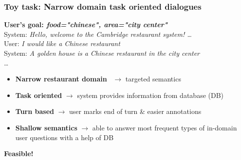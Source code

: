 \documentclass[10pt, compress,british,xcolor={svgnames,dvipsnames,x11names},trans]{beamer}
\def\sys#1{{\color{purple}System: \it #1}}
\def\usr#1{{\color{brown}User: \it #1}}
\begin{document}
\begin{frame}\frametitle{Toy task: Narrow domain task oriented dialogues}
    {\bf User's goal: {\it food="chinese", area="city center"}} \\
    \vfill
    \sys{Hello, welcome to the Cambridge restaurant system! \dots } \\
    \usr{I would like a Chinese restaurant} \\
    \sys{A golden house is a Chinese restaurant in the city center} \\
    \dots

    \begin{itemize}
        \item {\bf Narrow restaurant domain}~\cite{henderson2014second} $\longrightarrow$ targeted semantics
        \item {\bf Task oriented} $\longrightarrow$ system provides information from database (DB)
        \item {\bf Turn based} $\longrightarrow$ user marks end of turn \& easier annotations
        \item {\bf Shallow semantics} $\longrightarrow$ able to answer most frequent types of in-domain user questions with a help of DB
    \end{itemize}

    {\bf \large \color{darkgreen} Feasible! \citet{wen_networkbased_2016}}
\end{frame}
\end{document}
